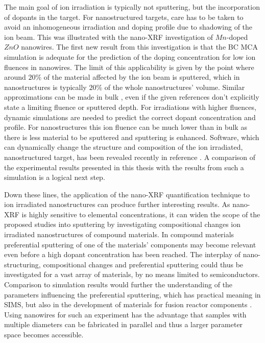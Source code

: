 The main goal of ion irradiation is typically not sputtering, but the incorporation of dopants in the target. For nanostructured targets, care has to be taken to avoid an inhomogeneous irradiation and doping profile due to shadowing of the ion beam. This was illustrated with the nano-XRF investigation of $Mn$-doped $ZnO$ nanowires. The first new result from this investigation is that the BC MCA simulation is adequate for the prediction of the doping concentration for low ion fluences in nanowires. The limit of this applicability is given by the point where around $20\%$ of the material affected by the ion beam is sputtered, which in nanostructures is typically $20\%$ of the whole nanostructures' volume. Similar approximations can be made in bulk \cite{moller_tridyn_1984,andersen_computer_1986,moller_tridyn-binary_1988,sigmund_alloy_1993,zaporozchenko_preferential_1995}, even if the given references don't explicitly state a limiting fluence or sputtered depth. For irradiations with higher fluences, dynamic simulations are needed to predict the correct dopant concentration and profile. For nanostructures this ion fluence can be much lower than in bulk as there is less material to be sputtered and sputtering is enhanced. Software, which can dynamically change the structure and composition of the ion irradiated, nanostructured target, has been revealed recently in reference \cite{moller_tri3dyn_2014}. A comparison of the experimental results presented in this thesis with the results from such a simulation is a logical next step.

Down these lines, the application of the nano-XRF quantification technique to ion irradiated nanostructures can produce further interesting results. As nano-XRF is highly sensitive to elemental concentrations, it can widen the scope of the proposed studies into sputtering by investigating compositional changes ion irradiated nanostructures of compound materials. In compound materials preferential sputtering of one of the materials' components may become relevant even before a high dopant concentration has been reached. The interplay of nano-structuring, compositional changes and preferential sputtering could thus be investigated for a vast array of materials, by no means limited to semiconductors. Comparison to simulation results would further the understanding of the parameters influencing the preferential sputtering, which has practical meaning in SIMS, but also in the development of materials for fusion reactor components \cite{kelly_attempt_1978,roth_sputtering_1990,kenmotsu_effect_2011}. Using nanowires for such an experiment has the advantage that samples with multiple diameters can be fabricated in parallel and thus a larger parameter space becomes accessible.

